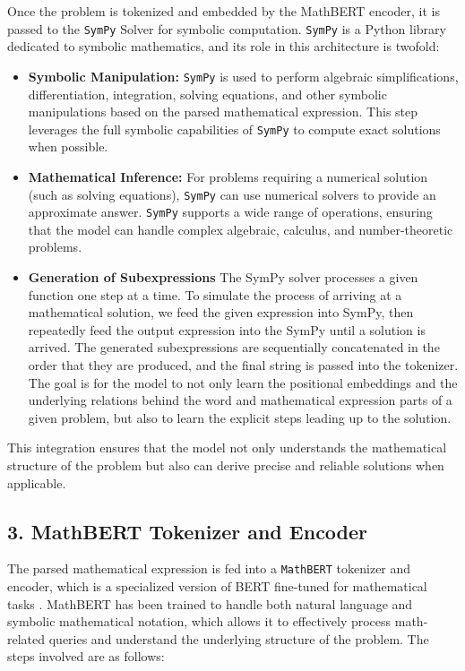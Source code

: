 \documentclass{article}
\begin{document}
Once the problem is tokenized and embedded by the MathBERT encoder, it is passed to the \texttt{SymPy} Solver for symbolic computation. \texttt{SymPy} is a Python library dedicated to symbolic mathematics, and its role in this architecture is twofold:

\begin{itemize}
    \item \textbf{Symbolic Manipulation:} \texttt{SymPy} is used to perform algebraic simplifications, differentiation, integration, solving equations, and other symbolic manipulations based on the parsed mathematical expression. This step leverages the full symbolic capabilities of \texttt{SymPy} to compute exact solutions when possible.
    \item \textbf{Mathematical Inference:} For problems requiring a numerical solution (such as solving equations), \texttt{SymPy} can use numerical solvers to provide an approximate answer. \texttt{SymPy} supports a wide range of operations, ensuring that the model can handle complex algebraic, calculus, and number-theoretic problems.
    \item \textbf{Generation of Subexpressions} The SymPy solver processes a given function one step at a time. To simulate the process of arriving at a mathematical solution, we feed the given expression into SymPy, then repeatedly feed the output expression into the SymPy until a solution is arrived. The generated subexpressions are sequentially concatenated in the order that they are produced, and the final string is passed into the tokenizer. The goal is for the model to not only learn the positional embeddings and the underlying relations behind the word and mathematical expression parts of a given problem, but also to learn the explicit steps leading up to the solution. 
\end{itemize}

This integration ensures that the model not only understands the mathematical structure of the problem but also can derive precise and reliable solutions when applicable.

\subsection{3. MathBERT Tokenizer and Encoder}

The parsed mathematical expression is fed into a \texttt{MathBERT} tokenizer and encoder, which is a specialized version of BERT fine-tuned for mathematical tasks \cite{mathbert}. MathBERT has been trained to handle both natural language and symbolic mathematical notation, which allows it to effectively process math-related queries and understand the underlying structure of the problem. The steps involved are as follows:
\end{document}

